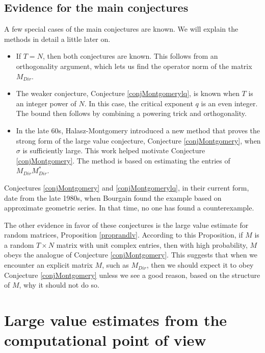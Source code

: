 \documentclass{amsart}
\begin{document}
\subsection{Evidence for the main conjectures}

A few special cases of the main conjectures are known.   We will explain the methods in detail a little later on.

\begin{itemize}

\item If $T = N$,  then both conjectures are known.   This follows from an orthogonality argument, which lets us find the operator norm of the matrix $M_{Dir}$.  

\item The weaker conjecture,  Conjecture \ref{conjMontgomerylq},  is known when $T$ is an integer power of $N$.  In this case, the critical exponent $q$ is an even integer.   The bound then follows by combining a powering trick and orthogonality.

\item  In the late 60s,  Halasz-Montgomery introduced a new method that proves the strong form of the large value conjecture,  Conjecture \ref{conjMontgomery},  when $\sigma$ is sufficiently large.   This work helped motivate Conjecture \ref{conjMontgomery}.  The method is based on estimating the entries of $M_{Dir} M_{Dir}^*$.  

\end{itemize}

Conjectures \ref{conjMontgomery} and \ref{conjMontgomerylq},  in their current form,  date from the late 1980s,  when Bourgain found the example based on approximate geometric series.   In that time,  no one has found a counterexample.   

The other evidence in favor of these conjectures is the large value estimate for random matrices,  Proposition \ref{proprandlv}.   According to this Proposition,  if $M$ is a random $T \times N$ matrix with unit complex entries,  then with high probability,  $M$ obeys the analogue of Conjecture \ref{conjMontgomery}.   This suggests that when we encounter an explicit matrix $M$,  such as $M_{Dir}$,  then we should expect it to obey Conjecture \ref{conjMontgomery} unless we see a good reason,  based on the structure of $M$,  why it should not do so. 



\section{Large value estimates from the computational point of view}
\end{document}

